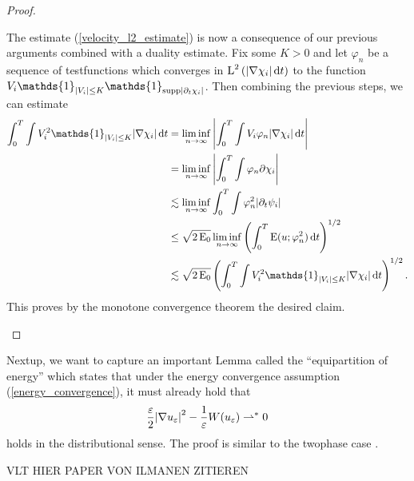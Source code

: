 \begin{proof}
\begin{description}[wide=0pt]
		The estimate (\ref{velocity_l2_estimate}) is now a consequence of our previous arguments combined with a duality estimate. Fix some $ K > 0 $ and let $ \varphi_{ n } $ be a sequence of testfunctions which converges in 
		$ \operatorname{L}^{ 2 } \left( \abs{ \nabla \chi_{ i } } \dd{ t } \right) $ to the function
		$ V_{ i } \mathds{ 1 }_{ \abs{ V_{ i } } \leq K } \mathds{ 1 }_{ \mathrm{supp} \abs{ \partial_{ t } \chi_{ i } } } $. Then combining the previous steps, we can estimate
		\begin{align*}
			\int_{ 0 }^{ T }
				\int
					V_{ i }^{ 2 } \mathds{ 1 }_{ \abs{ V_{ i } } \leq K }
				\abs{ \nabla \chi_{ i } }
			\dd{ t }
			& =
			\liminf_{ n \to \infty }
				\abs{
					\int_{ 0 }^{ T }
						\int
							V_{ i } \varphi_{ n } 
						\abs{ \nabla \chi_{ i } }
					\dd{ t }
				}
			\\
			& = 
			\liminf_{ n \to \infty }
				\abs{
					\int_{ 0 }^{ T }
						\int
							\varphi_{ n } \partial \chi_{ i }
				}
			\\
			& \lesssim
			\liminf_{ n \to \infty }
				\int_{ 0 }^{ T }
					\int
						\varphi_{ n }^{ 2 }
					\abs{ \partial_{ t } \psi_{ i } }
			\\
			& \leq
			\sqrt{ 2 \energy_{ 0 } }
			\liminf_{ n \to \infty }
				\left(
					\int_{ 0 }^{ T }
						\energy ( u ; \varphi_{ n }^{ 2 } )
					\dd{ t }
				\right)^{ 1/2 }
			\\
			& \lesssim
			\sqrt{ 2 \energy_{ 0 } }
			\left(
				\int_{ 0 }^{ T }
					\int
						V_{ i }^{ 2 }
						\mathds{ 1 }_{ \abs{ V_{ i } } \leq K }
					\abs{ \nabla \chi_{ i } }
				\dd{ t }
			\right)^{ 1 / 2 }.
		\end{align*}
		This proves by the monotone convergence theorem the desired claim.
	\end{description} 
\end{proof}

Nextup, we want to capture an important Lemma called the \enquote{equipartition of energy} which states that under the energy convergence assumption (\ref{energy_convergence}), it must already hold that
\begin{equation*}
	\frac{ \varepsilon }{ 2 } \abs{ \nabla u_{ \varepsilon } }^{ 2 }
	-
	\frac{ 1 }{ \varepsilon } W ( u_{ \varepsilon } )
	\rightharpoonup^{ \ast }
	0
\end{equation*}
holds in the distributional sense. The proof is similar to the twophase case .

VLT HIER PAPER VON ILMANEN ZITIEREN

